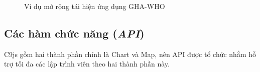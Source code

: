 \documentclass[12pt,a4paper,twoside]{article}
\begin{document}
\begin{figure}[!h]
	\begin{center}
    \caption{Ví dụ mở rộng tái hiện ứng dụng GHA-WHO}
    \label{fig:advance_1}
	\end{center}
\end{figure}
\subsection{Các hàm chức năng (\textit{API})}
C9js gồm hai thành phần chính là Chart và Map, nên API được tổ chức nhằm hỗ trợ tối đa các lập trình viên theo hai thành phần này.
\end{document}
